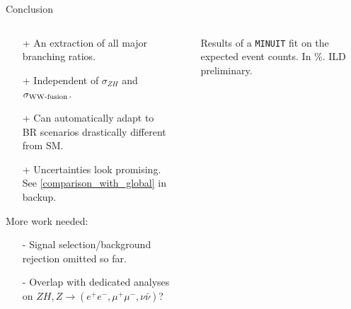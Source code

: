 
\begin{frame}{Conclusion}
  \begin{columns}[c, onlytextwidth]
\begin{column}{0.5\textwidth}
  \begin{itemize}
    \item[+] An extraction of all major branching ratios.
    \item[+] Independent of $\sigma_{ZH}$ and $\sigma_{\textnormal{WW-fusion}}$.
    \item[+] Can automatically adapt to BR scenarios
        drastically different from SM.
    \item[+] Uncertainties look promising.
        See {\color{llblue}\ref{comparison_with_global}} in backup.
  \end{itemize}
  More work needed:
  \begin{itemize}
    \item[-] Signal selection/background rejection omitted so far.
    \item[-] Overlap with dedicated analyses on $ZH, Z\to (e^+e^-, \mu^+\mu^-, \nu\bar{\nu})$?
  \end{itemize}
  \end{column}
  \begin{column}{0.05\textwidth}
  \end{column}
  \begin{column}{0.45\textwidth}
    \begin{table}
      \caption{Results of a \texttt{MINUIT} fit on the \hspace{\textwidth}
          expected event counts. In \%. ILD preliminary.}
      \end{table}
  \end{column}
  \end{columns}
\end{frame}